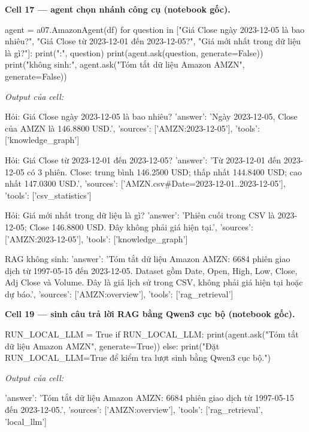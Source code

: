 \documentclass[12pt,a4paper]{report}
\begin{document}
\par\medskip\noindent\textbf{Cell 17 --- agent chọn nhánh công cụ (notebook gốc).}
\begin{NotebookCode}
agent = a07.AmazonAgent(df)
for question in ["Giá Close ngày 2023-12-05 là bao nhiêu?", "Giá Close từ 2023-12-01 đến 2023-12-05?", "Giá mới nhất trong dữ liệu là gì?"]:
    print(":", question)
    print(agent.ask(question, generate=False))
print("\nRAG không sinh:", agent.ask("Tóm tắt dữ liệu Amazon AMZN", generate=False))
\end{NotebookCode}
\noindent\textit{Output của cell:}
\begin{NotebookOutput}

Hỏi: Giá Close ngày 2023-12-05 là bao nhiêu?
{'answer': 'Ngày 2023-12-05, Close của AMZN là 146.8800 USD.', 'sources': ['AMZN:2023-12-05'], 'tools': ['knowledge_graph']}

Hỏi: Giá Close từ 2023-12-01 đến 2023-12-05?
{'answer': 'Từ 2023-12-01 đến 2023-12-05 có 3 phiên. Close: trung bình 146.2500 USD; thấp nhất 144.8400 USD; cao nhất 147.0300 USD.', 'sources': ['AMZN.csv#Date=2023-12-01..2023-12-05'], 'tools': ['csv_statistics']}

Hỏi: Giá mới nhất trong dữ liệu là gì?
{'answer': 'Phiên cuối trong CSV là 2023-12-05; Close 146.8800 USD. Đây không phải giá hiện tại.', 'sources': ['AMZN:2023-12-05'], 'tools': ['knowledge_graph']}

RAG không sinh: {'answer': 'Tóm tắt dữ liệu Amazon AMZN: 6684 phiên giao dịch từ 1997-05-15 đến 2023-12-05. Dataset gồm Date, Open, High, Low, Close, Adj Close và Volume. Đây là giá lịch sử trong CSV, không phải giá hiện tại hoặc dự báo.', 'sources': ['AMZN:overview'], 'tools': ['rag_retrieval']}
\end{NotebookOutput}

\par\medskip\noindent\textbf{Cell 19 --- sinh câu trả lời RAG bằng Qwen3 cục bộ (notebook gốc).}
\begin{NotebookCode}
RUN_LOCAL_LLM = True
if RUN_LOCAL_LLM:
    print(agent.ask("Tóm tắt dữ liệu Amazon AMZN", generate=True))
else:
    print("Đặt RUN_LOCAL_LLM=True để kiểm tra lượt sinh bằng Qwen3 cục bộ.")
\end{NotebookCode}
\noindent\textit{Output của cell:}
\begin{NotebookOutput}
{'answer': 'Tóm tắt dữ liệu Amazon AMZN: 6684 phiên giao dịch từ 1997-05-15 đến 2023-12-05.', 'sources': ['AMZN:overview'], 'tools': ['rag_retrieval', 'local_llm']}
\end{NotebookOutput}
\end{document}
